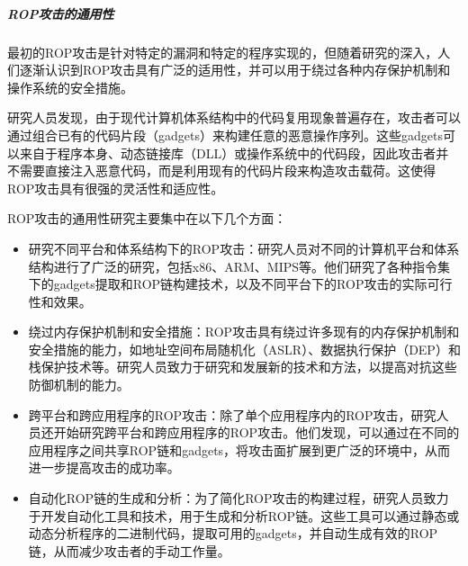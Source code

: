 \documentclass[12pt,a4paper]{ctexart}
\numberwithin{figure}{section}
\begin{document}
\subparagraph{ROP攻击的通用性}
\par 最初的ROP攻击是针对特定的漏洞和特定的程序实现的，但随着研究的深入，人们逐渐认识到ROP攻击具有广泛的适用性，并可以用于绕过各种内存保护机制和操作系统的安全措施。
\par 研究人员发现，由于现代计算机体系结构中的代码复用现象普遍存在，攻击者可以通过组合已有的代码片段（gadgets）来构建任意的恶意操作序列。这些gadgets可以来自于程序本身、动态链接库（DLL）或操作系统中的代码段，因此攻击者并不需要直接注入恶意代码，而是利用现有的代码片段来构造攻击载荷。这使得ROP攻击具有很强的灵活性和适应性。
\par ROP攻击的通用性研究主要集中在以下几个方面：
\begin{itemize}
    \item 研究不同平台和体系结构下的ROP攻击：研究人员对不同的计算机平台和体系结构进行了广泛的研究，包括x86、ARM、MIPS等。他们研究了各种指令集下的gadgets提取和ROP链构建技术，以及不同平台下的ROP攻击的实际可行性和效果。
    \item 绕过内存保护机制和安全措施：ROP攻击具有绕过许多现有的内存保护机制和安全措施的能力，如地址空间布局随机化（ASLR）、数据执行保护（DEP）和栈保护技术等。研究人员致力于研究和发展新的技术和方法，以提高对抗这些防御机制的能力。
    \item 跨平台和跨应用程序的ROP攻击：除了单个应用程序内的ROP攻击，研究人员还开始研究跨平台和跨应用程序的ROP攻击。他们发现，可以通过在不同的应用程序之间共享ROP链和gadgets，将攻击面扩展到更广泛的环境中，从而进一步提高攻击的成功率。
    \item 自动化ROP链的生成和分析：为了简化ROP攻击的构建过程，研究人员致力于开发自动化工具和技术，用于生成和分析ROP链。这些工具可以通过静态或动态分析程序的二进制代码，提取可用的gadgets，并自动生成有效的ROP链，从而减少攻击者的手动工作量。
\end{itemize}
\end{document}
